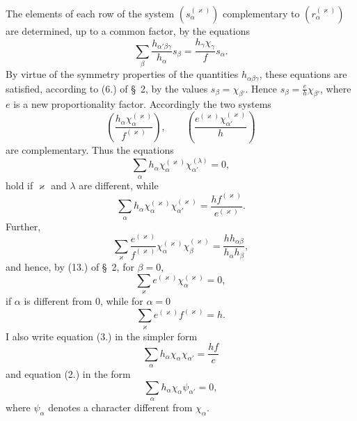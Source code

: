 \documentclass[11pt]{article}
\begin{document}
The elements of each row of the system $(s_\alpha^{(\varkappa)})$ complementary to $(r_\alpha^{(\varkappa)})$ are determined, up to a common factor, by the equations
\[
\sum_\beta \frac{h_{\alpha'\beta\gamma}}{h_\alpha}s_\beta=\frac{h_\gamma\chi_\gamma}{f}s_\alpha.
\]
By virtue of the symmetry properties of the quantities $h_{\alpha\beta\gamma}$, these equations are satisfied, according to (6.) of \S~2, by the values $s_\beta=\chi_{\beta'}$. Hence $s_\beta=\frac{e}{h}\chi_{\beta'}$, where $e$ is a new proportionality factor. Accordingly the two systems
\begin{equation*}\tag{1.}
\left(\frac{h_\alpha\chi_\alpha^{(\varkappa)}}{f^{(\varkappa)}}\right),\qquad
\left(\frac{e^{(\varkappa)}\chi_{\alpha'}^{(\varkappa)}}{h}\right)
\end{equation*}
are complementary. Thus the equations
\begin{equation*}\tag{2.}
\sum_\alpha h_\alpha\chi_\alpha^{(\varkappa)}\chi_{\alpha'}^{(\lambda)}=0,
\end{equation*}
hold if $\varkappa$ and $\lambda$ are different, while
\begin{equation*}\tag{3.}
\sum_\alpha h_\alpha\chi_\alpha^{(\varkappa)}\chi_{\alpha'}^{(\varkappa)}=\frac{h f^{(\varkappa)}}{e^{(\varkappa)}}.
\end{equation*}
Further,
\begin{equation*}\tag{4.}
\sum_\varkappa\frac{e^{(\varkappa)}}{f^{(\varkappa)}}\chi_\alpha^{(\varkappa)}\chi_\beta^{(\varkappa)}=\frac{h h_{\alpha\beta}}{h_\alpha h_\beta},
\end{equation*}
and hence, by (13.) of \S~2, for $\beta=0$,
\begin{equation*}\tag{5.}
\sum_\varkappa e^{(\varkappa)}\chi_\alpha^{(\varkappa)}=0,
\end{equation*}
if $\alpha$ is different from 0, while for $\alpha=0$
\begin{equation*}\tag{6.}
\sum_\varkappa e^{(\varkappa)}f^{(\varkappa)}=h.
\end{equation*}
I also write equation (3.) in the simpler form
\begin{equation*}\tag{7.}
\sum_\alpha h_\alpha\chi_\alpha\chi_{\alpha'}=\frac{hf}{e}
\end{equation*}
and equation (2.) in the form
\begin{equation*}\tag{8.}
\sum_\alpha h_\alpha\chi_\alpha\psi_{\alpha'}=0,
\end{equation*}
where $\psi_\alpha$ denotes a character different from $\chi_\alpha$.
\end{document}
